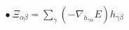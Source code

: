\documentclass[preview]{standalone}
\begin{document}
\begin{align*}
\bullet\ \Xi_{\alpha\beta} = \sum_\gamma (-\nabla_{h_{\gamma\alpha}} E) h_{\gamma\beta}
\end{align*}
\end{document}
